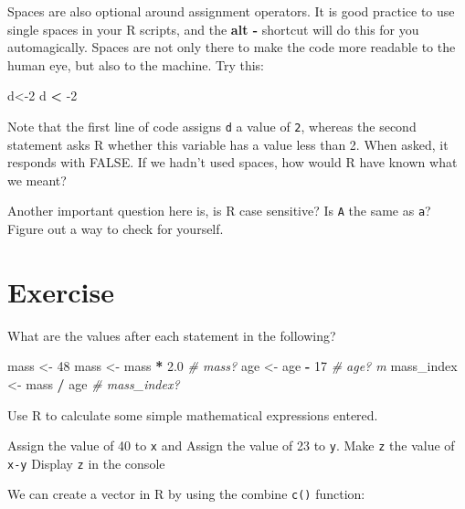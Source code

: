 \documentclass[
]{book}
\newenvironment{Shaded}{\begin{snugshade}}{\end{snugshade}}
\newcommand{\CommentTok}[1]{\textcolor[rgb]{0.56,0.35,0.01}{\textit{#1}}}
\newcommand{\DecValTok}[1]{\textcolor[rgb]{0.00,0.00,0.81}{#1}}
\newcommand{\FloatTok}[1]{\textcolor[rgb]{0.00,0.00,0.81}{#1}}
\newcommand{\NormalTok}[1]{#1}
\newcommand{\OperatorTok}[1]{\textcolor[rgb]{0.81,0.36,0.00}{\textbf{#1}}}
\newcommand{\StringTok}[1]{\textcolor[rgb]{0.31,0.60,0.02}{#1}}
\begin{document}
Spaces are also optional around assignment operators. It is good practice to use single spaces in your R scripts, and the \textbf{alt -} shortcut will do this for you automagically. Spaces are not only there to make the code more readable to the human eye, but also to the machine. Try this:

\begin{Shaded}
\begin{Highlighting}[]
\NormalTok{d<{-}}\DecValTok{2}
\NormalTok{d }\OperatorTok{<}\StringTok{ }\DecValTok{{-}2}
\end{Highlighting}
\end{Shaded}

Note that the first line of code assigns \texttt{d} a value of \texttt{2}, whereas the second statement asks R whether this variable has a value less than 2. When asked, it responds with FALSE. If we hadn't used spaces, how would R have known what we meant?

Another important question here is, is R case sensitive? Is \texttt{A} the same as \texttt{a}? Figure out a way to check for yourself.

\hypertarget{exercise}{%
\section{Exercise}\label{exercise}}

What are the values after each statement in the following?

\begin{Shaded}
\begin{Highlighting}[]
\NormalTok{mass <{-}}\StringTok{ }\DecValTok{48} 
\NormalTok{mass <{-}}\StringTok{ }\NormalTok{mass }\OperatorTok{*}\StringTok{ }\FloatTok{2.0} \CommentTok{\# mass? }
\NormalTok{age <{-}}\StringTok{ }\NormalTok{age }\OperatorTok{{-}}\StringTok{ }\DecValTok{17} \CommentTok{\# age? m}
\NormalTok{mass\_index <{-}}\StringTok{ }\NormalTok{mass }\OperatorTok{/}\StringTok{ }\NormalTok{age }\CommentTok{\# mass\_index?}
\end{Highlighting}
\end{Shaded}

Use R to calculate some simple mathematical expressions entered.

Assign the value of 40 to \texttt{x} and Assign the value of 23 to \texttt{y}. Make \texttt{z} the value of \texttt{x-y} Display \texttt{z} in the console

We can create a vector in R by using the combine \texttt{c()} function:
\end{document}
